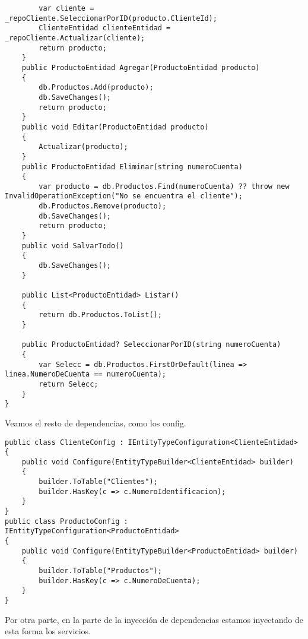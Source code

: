 \documentclass[executivepaper]{article}
\begin{document}
\begin{lstlisting}
        var cliente = _repoCliente.SeleccionarPorID(producto.ClienteId);
        ClienteEntidad clienteEntidad = _repoCliente.Actualizar(cliente);
        return producto;
    }
    public ProductoEntidad Agregar(ProductoEntidad producto)
    {
        db.Productos.Add(producto);
        db.SaveChanges();
        return producto;
    }
    public void Editar(ProductoEntidad producto)
    {
        Actualizar(producto);
    }
    public ProductoEntidad Eliminar(string numeroCuenta)
    {
        var producto = db.Productos.Find(numeroCuenta) ?? throw new InvalidOperationException("No se encuentra el cliente");
        db.Productos.Remove(producto);
        db.SaveChanges();
        return producto;
    }
    public void SalvarTodo()
    {
        db.SaveChanges();
    }

    public List<ProductoEntidad> Listar()
    {
        return db.Productos.ToList();
    }

    public ProductoEntidad? SeleccionarPorID(string numeroCuenta)
    {
        var Selecc = db.Productos.FirstOrDefault(linea => linea.NumeroDeCuenta == numeroCuenta);
        return Selecc;
    }
}
\end{lstlisting}

Veamos el resto de dependencias, como los config.

\begin{lstlisting}
public class ClienteConfig : IEntityTypeConfiguration<ClienteEntidad>
{
    public void Configure(EntityTypeBuilder<ClienteEntidad> builder)
    {
        builder.ToTable("Clientes");
        builder.HasKey(c => c.NumeroIdentificacion);
    }
}
public class ProductoConfig : IEntityTypeConfiguration<ProductoEntidad>
{
    public void Configure(EntityTypeBuilder<ProductoEntidad> builder)
    {
        builder.ToTable("Productos");
        builder.HasKey(c => c.NumeroDeCuenta);
    }
}
\end{lstlisting}

Por otra parte, en la parte de la inyección de dependencias estamos inyectando de esta forma los servicios.
\end{document}
